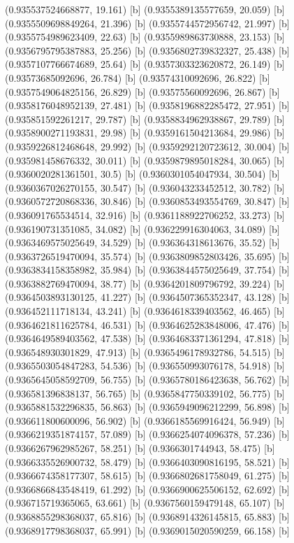 {{{(0.935537524668877, 19.161) [b] 
(0.9355389135577659, 20.059) [b] 
(0.9355509698849264, 21.396) [b] 
(0.9355744572956742, 21.997) [b] 
(0.9355754989623409, 22.63) [b] 
(0.9355989863730888, 23.153) [b] 
(0.9356795795387883, 25.256) [b] 
(0.9356802739832327, 25.438) [b] 
(0.9357107766674689, 25.64) [b] 
(0.9357303323620872, 26.149) [b] 
(0.93573685092696, 26.784) [b] 
(0.93574310092696, 26.822) [b] 
(0.9357549064825156, 26.829) [b] 
(0.93575560092696, 26.867) [b] 
(0.9358176048952139, 27.481) [b] 
(0.9358196882285472, 27.951) [b] 
(0.935851592261217, 29.787) [b] 
(0.9358834962938867, 29.789) [b] 
(0.9358900271193831, 29.98) [b] 
(0.9359161504213684, 29.986) [b] 
(0.9359226812468648, 29.992) [b] 
(0.9359292120723612, 30.004) [b] 
(0.935981458676332, 30.011) [b] 
(0.9359879895018284, 30.065) [b] 
(0.9360020281361501, 30.5) [b] 
(0.9360301054047934, 30.504) [b] 
(0.9360367026270155, 30.547) [b] 
(0.936043233452512, 30.782) [b] 
(0.9360572720868336, 30.846) [b] 
(0.9360853493554769, 30.847) [b] 
(0.936091765534514, 32.916) [b] 
(0.9361188922706252, 33.273) [b] 
(0.936190731351085, 34.082) [b] 
(0.936229916304063, 34.089) [b] 
(0.9363469575025649, 34.529) [b] 
(0.936364318613676, 35.52) [b] 
(0.9363726519470094, 35.574) [b] 
(0.9363809852803426, 35.695) [b] 
(0.9363834158358982, 35.984) [b] 
(0.9363844575025649, 37.754) [b] 
(0.9363882769470094, 38.77) [b] 
(0.9364201809796792, 39.224) [b] 
(0.9364503893130125, 41.227) [b] 
(0.9364507365352347, 43.128) [b] 
(0.936452111718134, 43.241) [b] 
(0.9364618339403562, 46.465) [b] 
(0.9364621811625784, 46.531) [b] 
(0.9364625283848006, 47.476) [b] 
(0.9364649589403562, 47.538) [b] 
(0.9364683371361294, 47.818) [b] 
(0.936548930301829, 47.913) [b] 
(0.9365496178932786, 54.515) [b] 
(0.9365503054847283, 54.536) [b] 
(0.936550993076178, 54.918) [b] 
(0.9365645058592709, 56.755) [b] 
(0.9365780186423638, 56.762) [b] 
(0.936581396838137, 56.765) [b] 
(0.9365847750339102, 56.775) [b] 
(0.9365881532296835, 56.863) [b] 
(0.9365949096212299, 56.898) [b] 
(0.936611800600096, 56.902) [b] 
(0.9366185569916424, 56.949) [b] 
(0.9366219351874157, 57.089) [b] 
(0.9366254074096378, 57.236) [b] 
(0.9366267962985267, 58.251) [b] 
(0.9366301744943, 58.475) [b] 
(0.9366335526900732, 58.479) [b] 
(0.9366403090816195, 58.521) [b] 
(0.9366674358177307, 58.615) [b] 
(0.9366802681758049, 61.275) [b] 
(0.9366866843548419, 61.292) [b] 
(0.9366900625506152, 62.692) [b] 
(0.936715719365065, 63.661) [b] 
(0.9367560159479148, 65.107) [b] 
(0.9368855298368037, 65.816) [b] 
(0.9368914326145815, 65.883) [b] 
(0.9368917798368037, 65.991) [b] 
(0.9369015020590259, 66.158) [b] 
}}}
